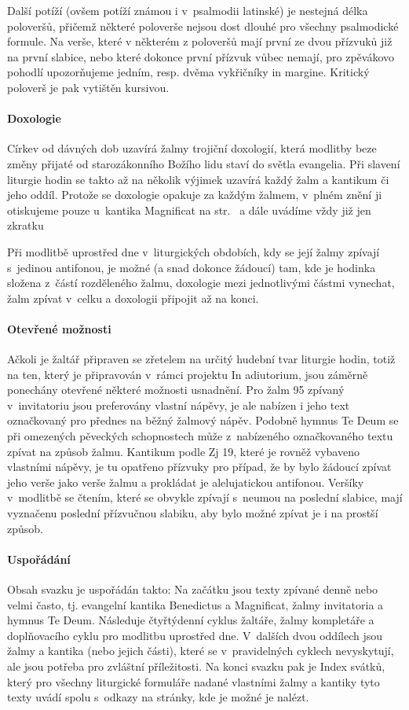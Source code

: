\documentclass[a5paper, twoside]{article}
\begin{document}
Další potíží (ovšem potíží známou i v~psalmodii latinské) je nestej\-ná délka
poloveršů, přičemž některé poloverše nejsou dost dlouhé pro všechny
psalmodické formule. Na verše, které v některém z poloveršů
mají první ze dvou přízvuků již 
na první slabice, nebo které dokonce první přízvuk vůbec nemají,
pro zpěvákovo pohodlí upozorňujeme jedním, resp. dvěma vykřičníky in margine.
Kritický poloverš je pak vytištěn kursivou.

\paragraph{Doxologie}
Církev od dávných dob uzavírá žalmy trojiční doxologií, která modlitby
beze změny přijaté od starozákonního Božího lidu staví do světla evangelia.
Při slavení liturgie hodin se takto až na několik výjimek uzavírá
každý žalm a kantikum či jeho oddíl.
Protože se doxologie opakuje za každým žalmem, v~plném znění ji otiskujeme
pouze u~kantika Magnificat na str.~\pageref{kantmagnificat} a dále uvádíme
vždy již jen zkratku 

Při modlitbě uprostřed dne v~liturgických obdobích, kdy se její žalmy zpívají 
s~jedinou antifonou, je možné (a snad dokonce žádoucí)
tam, kde je hodinka složena z~částí
rozděleného žalmu, doxologie mezi jednotlivými částmi vynechat, žalm zpívat 
v~celku a doxologii připojit až na konci.

\paragraph{Otevřené možnosti}
Ačkoli je žaltář připraven se zřetelem na určitý hudební tvar liturgie hodin,
totiž na ten, který je připravován v~rámci projektu In adiutorium,
jsou záměrně ponechány otevřené některé možnosti usnadnění.
Pro žalm 95 zpívaný v~invitatoriu jsou preferovány vlastní nápěvy, je ale
nabízen i jeho text označkovaný pro přednes na běžný žalmový nápěv.
Podobně hymnus Te Deum se při omezených pěveckých schopnostech může 
z~nabízeného označkovaného textu zpívat na způsob žalmu.
Kantikum podle Zj 19, které je rovněž vybaveno vlastními nápěvy, je tu
opatřeno přízvuky pro případ, že by bylo žádoucí zpívat jeho verše jako
verše žalmu a prokládat je alelujatickou antifonou.
Veršíky v~modlitbě se čtením, které se obvykle zpívají s~neumou na poslední
slabice, mají vyznačenu poslední přízvučnou slabiku, aby bylo možné zpívat
je i na prostší způsob.

\paragraph{Uspořádání}
Obsah svazku je uspořádán takto:
Na začátku jsou texty zpívané denně nebo velmi často, tj. evangelní
kantika Benedictus a Magnificat, žalmy invitatoria a hymnus Te Deum.
Následuje čtyřtýdenní cyklus žaltáře, žalmy kompletáře a doplňovacího cyklu
pro modlitbu uprostřed dne.
V~dalších dvou oddílech jsou žalmy a kantika (nebo jejich části), 
které se v~pravidelných
cyklech nevyskytují, ale jsou potřeba pro zvláštní příležitosti.
Na konci svazku pak je Index svátků, který pro všechny liturgické formuláře
nadané vlastními žalmy a kantiky tyto texty uvádí spolu s~odkazy na stránky,
kde je možné je nalézt.
\end{document}
